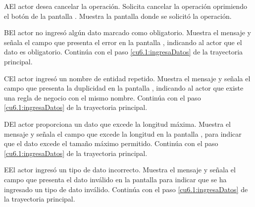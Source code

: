  \begin{UCtrayectoriaA}{A}{El actor desea cancelar la operación.}
    \UCpaso[\UCactor] Solicita cancelar la operación oprimiendo el botón  de la pantalla .
    \UCpaso[\UCsist] Muestra la pantalla donde se solicitó la operación.
 \end{UCtrayectoriaA} 
 \begin{UCtrayectoriaA}{B}{El actor no ingresó algún dato marcado como obligatorio.}
    \UCpaso[\UCsist] Muestra el mensaje  y señala el campo que presenta el error en la pantalla 
	    , indicando al actor que el dato es obligatorio.
    \UCpaso[] Continúa con el paso \ref{cu6.1:ingresaDatos} de la trayectoria principal.
 \end{UCtrayectoriaA}
 \begin{UCtrayectoriaA}{C}{El actor ingresó un nombre de entidad repetido.}
    \UCpaso[\UCsist] Muestra el mensaje  y señala el campo que presenta la duplicidad en la pantalla 
	    , indicando al actor que existe una regla de negocio con el mismo nombre.
    \UCpaso[] Continúa con el paso \ref{cu6.1:ingresaDatos} de la trayectoria principal.
 \end{UCtrayectoriaA}
 
 \begin{UCtrayectoriaA}{D}{El actor proporciona un dato que excede la longitud máxima.}
    \UCpaso[\UCsist] Muestra el mensaje  y señala el campo que excede la 
    longitud en la pantalla , para indicar que el dato excede el tamaño máximo permitido.
    \UCpaso[] Continúa con el paso \ref{cu6.1:ingresaDatos} de la trayectoria principal.
 \end{UCtrayectoriaA}
 
 \begin{UCtrayectoriaA}{E}{El actor ingresó un tipo de dato incorrecto.}
    \UCpaso[\UCsist] Muestra el mensaje  y señala el campo que presenta el dato inválido en la 
    pantalla  para indicar que se ha ingresado un tipo de dato inválido.
    \UCpaso[] Continúa con el paso \ref{cu6.1:ingresaDatos} de la trayectoria principal.
 \end{UCtrayectoriaA}

